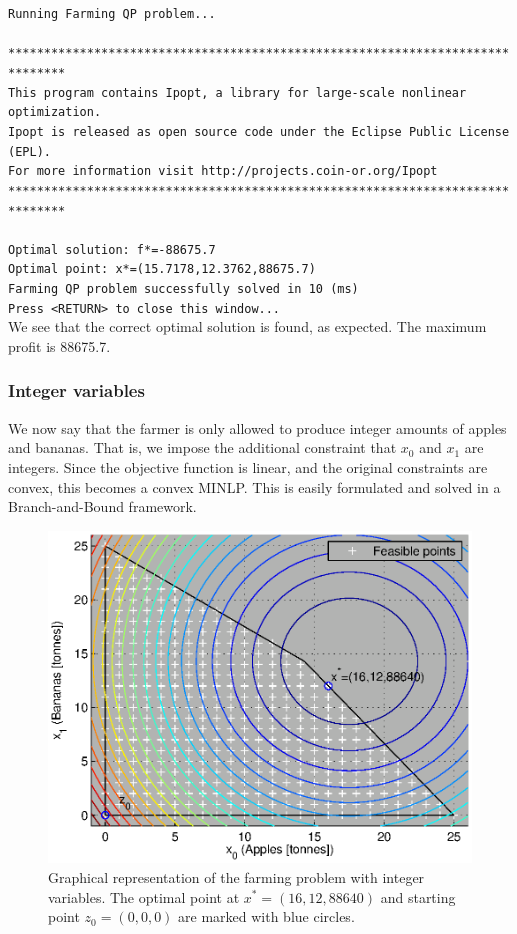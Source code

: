 \newline
{\footnotesize{\texttt{Running Farming QP problem...\\
\\
******************************************************************************\\
This program contains Ipopt, a library for large-scale nonlinear optimization.\\
 Ipopt is released as open source code under the Eclipse Public License (EPL).\\
         For more information visit http://projects.coin-or.org/Ipopt\\
******************************************************************************\\
\\
Optimal solution: f*=-88675.7\\
Optimal point: x*=(15.7178,12.3762,88675.7)\\
Farming QP problem successfully solved in 10 (ms)\\
Press <RETURN> to close this window...\\
}}}
We see that the correct optimal solution is found, as expected. The maximum profit is 88675.7.

\subsubsection{Integer variables} \label{sec:farminginteger}
We now say that the farmer is only allowed to produce integer amounts of apples and bananas. That is, we impose the additional constraint that $x_0$ and $x_1$ are integers. Since the objective function is linear, and the original constraints are convex, this becomes a convex MINLP. This is easily formulated and solved in a Branch-and-Bound framework.

\begin{figure}[H]
\centering
\includegraphics[width=\textwidth]{figures/FarmingInteger.eps}
\caption{Graphical representation of the farming problem with integer variables. The optimal point at $x^*=(16,12,88640)$ and starting point $z_0 = (0,0,0)$ are marked with blue circles.}
\label{fig:farmingInteger}
\end{figure}


